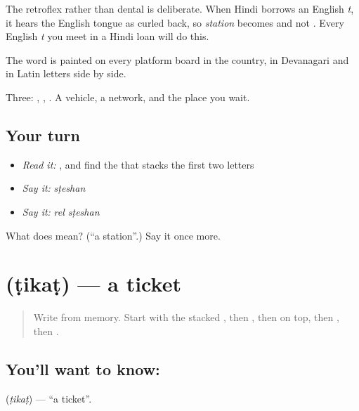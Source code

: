 The retroflex  rather than dental  is deliberate. When Hindi borrows an English \emph{t}, it hears the English tongue as curled back, so \emph{station} becomes  and not . Every English \emph{t} you meet in a Hindi loan will do this.

The word is painted on every platform board in the country, in Devanagari and in Latin letters side by side.

\begin{grammarlens}[title={What you've built}]
Three: , , . A vehicle, a network, and the place you wait.
\end{grammarlens}

\subsection*{Your turn}
\begin{itemize}
\raggedright
  \item \emph{Read it:} , and find the  that stacks the first two letters
  \item \emph{Say it:} \emph{sṭeshan}
  \item \emph{Say it:} \emph{rel sṭeshan}
\end{itemize}

\begin{tcolorbox}[breakable,colback=teal!4,colframe=teal!35!black,title={Before you move on}]
What does  mean? (\textquotedblleft{}a station\textquotedblright{}.) Say it once more.
\end{tcolorbox}
\section[ṭikaṭ]{ (ṭikaṭ) — a ticket}

\label{lesson:HI-C69-ticket}



\begin{quote}
Write \textbf{} from memory. Start with the stacked , then , then  on top, then , then .
\end{quote}

\subsection*{You'll want to know: }
\textbf{} (\emph{ṭikaṭ}) — \textquotedblleft{}a ticket\textquotedblright{}.

